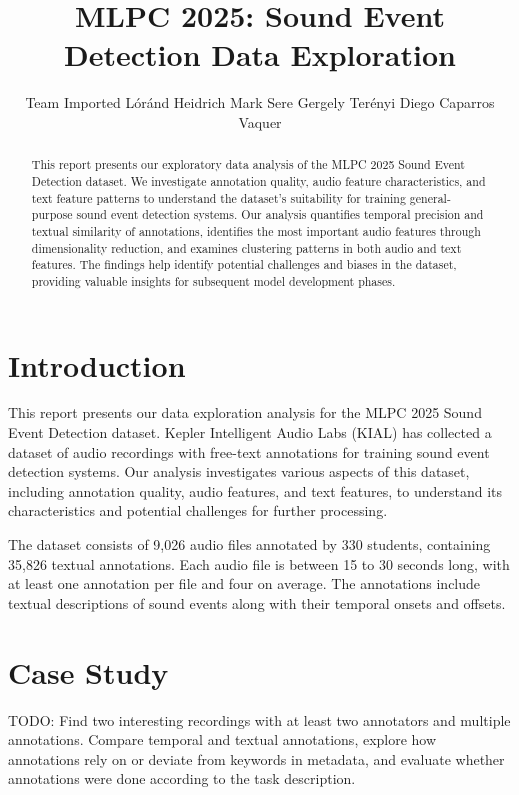 \documentclass{article}
\title{MLPC 2025: Sound Event Detection Data Exploration}
\author{
  Team Imported \AND
  Lóránd Heidrich
  \And
  Mark Sere
  \And 
  Gergely Terényi
  \And 
  Diego Caparros Vaquer
}
\begin{document}
\maketitle

\begin{abstract}
This report presents our exploratory data analysis of the MLPC 2025 Sound Event Detection dataset. We investigate annotation quality, audio feature characteristics, and text feature patterns to understand the dataset's suitability for training general-purpose sound event detection systems. Our analysis quantifies temporal precision and textual similarity of annotations, identifies the most important audio features through dimensionality reduction, and examines clustering patterns in both audio and text features. The findings help identify potential challenges and biases in the dataset, providing valuable insights for subsequent model development phases.
\end{abstract}

\section{Introduction}

This report presents our data exploration analysis for the MLPC 2025 Sound Event Detection dataset. Kepler Intelligent Audio Labs (KIAL) has collected a dataset of audio recordings with free-text annotations for training sound event detection systems. Our analysis investigates various aspects of this dataset, including annotation quality, audio features, and text features, to understand its characteristics and potential challenges for further processing.

The dataset consists of 9,026 audio files annotated by 330 students, containing 35,826 textual annotations. Each audio file is between 15 to 30 seconds long, with at least one annotation per file and four on average. The annotations include textual descriptions of sound events along with their temporal onsets and offsets.

\section{Case Study}
\label{sec:case_study}

TODO: Find two interesting recordings with at least two annotators and multiple annotations. Compare temporal and textual annotations, explore how annotations rely on or deviate from keywords in metadata, and evaluate whether annotations were done according to the task description.
\end{document}
